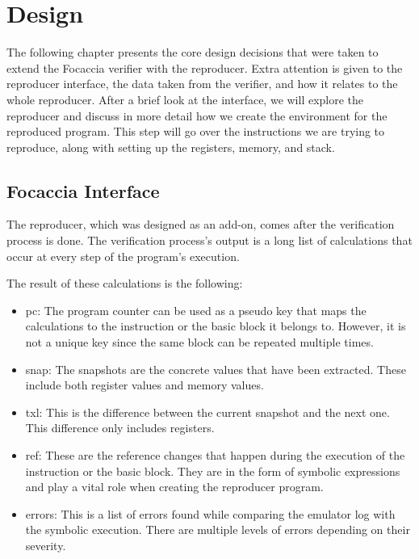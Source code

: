 
\chapter{Design}\label{chapter:design}
The following chapter presents the core design decisions that were taken to extend the Focaccia verifier with the reproducer.
Extra attention is given to the reproducer interface, the data taken from the verifier, and how it relates to the whole reproducer.
After a brief look at the interface, we will explore the reproducer and discuss in more detail how we create the environment for the reproduced program.
This step will go over the instructions we are trying to reproduce, along with setting up the registers, memory, and stack.

\section{Focaccia Interface}
The reproducer, which was designed as an add-on, comes after the verification process is done.
The verification process's output is a long list of calculations that occur at every step of the program's execution.

The result of these calculations is the following:
\begin{itemize}
    \item pc: The program counter can be used as a pseudo key that maps the calculations to the instruction or the basic block it belongs to. However, it is not a unique key since the same block can be repeated multiple times.
    \item snap: The snapshots are the concrete values that have been extracted. These include both register values and memory values.
    \item txl: This is the difference between the current snapshot and the next one. This difference only includes registers.
    \item ref: These are the reference changes that happen during the execution of the instruction or the basic block. They are in the form of symbolic expressions and play a vital role when creating the reproducer program.
    \item errors: This is a list of errors found while comparing the emulator log with the symbolic execution. There are multiple levels of errors depending on their severity.
\end{itemize}

